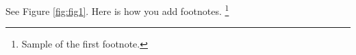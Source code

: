 \documentclass{article}
\begin{document}




See Figure \ref{fig:fig1}. Here is how you add footnotes. \footnote{Sample of the first footnote.}
\lipsum[11]
\end{document}
